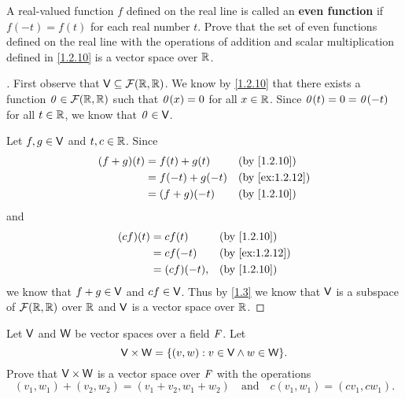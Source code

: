 \begin{ex}\label{ex:1.2.12}
	A real-valued function \(f\) defined on the real line is called an \textbf{even function} if \(f(-t) = f(t)\) for each real number \(t\).
	Prove that the set of even functions defined on the real line with the operations of addition and scalar multiplication defined in \cref{1.2.10} is a vector space over \(\mathbb{R}\).
\end{ex}

\begin{proof}[]
	First observe that \(\V \subseteq \fs{\R}{\R}\).
	We know by \cref{1.2.10} that there exists a function \(\zv \in \fs{\R}{\R}\) such that \(\mathit{0}(x) = 0\) for all \(x \in \mathbb{R}\).
	Since \(\mathit{0}(t) = 0 = \mathit{0}(-t)\) for all \(t \in \mathbb{R}\), we know that \(\mathit{0} \in \mathsf{V}\).

	Let \(f, g \in \mathsf{V}\) and \(t, c \in \mathbb{R}\).
	Since
	\begin{align*}
		(f + g)(t) & = f(t) + g(t)   &  & \text{(by \cref{1.2.10})}    \\
		           & = f(-t) + g(-t) &  & \text{(by \cref{ex:1.2.12})} \\
		           & = (f + g)(-t)   &  & \text{(by \cref{1.2.10})}
	\end{align*}
	and
	\begin{align*}
		(cf)(t) & = cf(t)     &  & \text{(by \cref{1.2.10})}    \\
		        & = cf(-t)    &  & \text{(by \cref{ex:1.2.12})} \\
		        & = (cf)(-t), &  & \text{(by \cref{1.2.10})}
	\end{align*}
	we know that \(f + g \in \mathsf{V}\) and \(cf \in \mathsf{V}\).
	Thus by \cref{1.3} we know that \(\mathsf{V}\) is a subspace of \(\fs{\R}{\R}\) over \(\mathbb{R}\) and \(\mathsf{V}\) is a vector space over \(\mathbb{R}\).
\end{proof}

\setcounter{ex}{20}
\begin{ex}\label{ex:1.2.21}
	Let \(\mathsf{V}\) and \(\mathsf{W}\) be vector spaces over a field \(\mathit{F}\).
	Let
	\[
		\V \times \W = \set{(v, w) : v \in \V \land w \in \W}.
	\]
	Prove that \(\mathsf{V} \times \mathsf{W}\) is a vector space over \(\mathit{F}\) with the operations
	\[
		(v_1, w_1) + (v_2, w_2) = (v_1 + v_2, w_1 + w_2) \quad \text{and} \quad c(v_1, w_1) = (cv_1, cw_1).
	\]
\end{ex}

